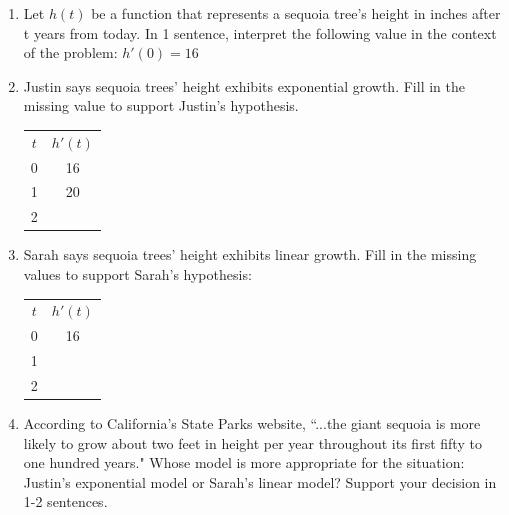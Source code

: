 \documentclass{article}
\begin{document}
\begin{enumerate}
\begin{enumerate}
   \item Let $h(t)$ be a function that represents a sequoia tree's height in inches after t years from today. In 1 sentence, interpret the following value in the context of the problem: $h'(0)=16$
        \vfill
        \item Justin says sequoia trees' height exhibits exponential growth. Fill in the missing value to support Justin's hypothesis. 
        \begin{center}
            \begin{tabular}{ |c|c| } 
                \hline
                $t$ & $h'(t)$ \\ 
                0 & 16 \\ 
                1 & 20 \\ 
                2 &  \\ 
                \hline
            \end{tabular}
        \end{center}
        \item Sarah says sequoia trees' height exhibits linear growth. Fill in the missing values to support Sarah's hypothesis: 
         \begin{center}
            \begin{tabular}{ |c|c| } 
                \hline
                $t$ & $h'(t)$ \\ 
                0 & 16 \\ 
                1 &  \\ 
                2 &  \\ 
                \hline
            \end{tabular}
        \end{center}
    \item According to California's State Parks website, ``...the giant sequoia is more likely to grow about two feet in height per year throughout its first fifty to one hundred years." Whose model is more appropriate for the situation: Justin's exponential model or Sarah's linear model? Support your decision in 1-2 sentences.
    \vfill 
    
    \end{enumerate}
\newpage


\end{enumerate}
\end{document}
